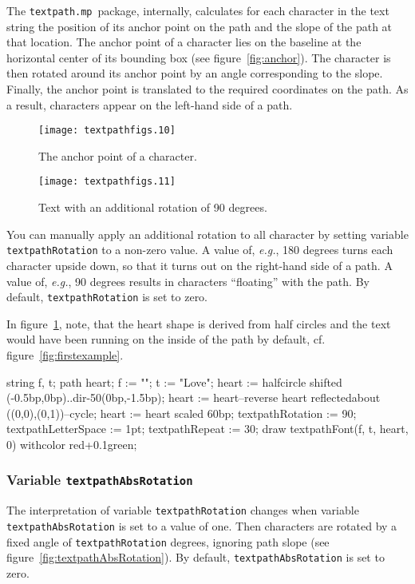 \documentclass{article}
\newcommand*{\cmd}[1]{\texttt{#1}}
\newcommand*{\pkg}{\cmd{textpath.mp}}
\newenvironment{listing}{%
  \small%
  \verbatim%
}{%
  \endverbatim%
}
\begin{document}
The \pkg\ package, internally, calculates for each character in the text string the position of its anchor point on the path and the slope of the path at that location.  The anchor point of a character lies on the baseline at the horizontal center of its bounding box (see figure~\ref{fig:anchor}).  The character is then rotated around its anchor point by an angle corresponding to the slope.  Finally, the anchor point is translated to the required coordinates on the path.  As a result, characters appear on the left-hand side of a path.

\begin{figure}
\begin{minipage}[t]{.45\linewidth}
  \centering
  \texttt{[image: textpathfigs.10]}
  \caption{The anchor point of a character.}
  \label{fig:anchor}
\end{minipage}\hfill
\begin{minipage}[t]{.45\linewidth}
  \centering
  \texttt{[image: textpathfigs.11]}
  \caption{Text with an additional rotation of 90 degrees.}
  \label{fig:textpathRotation}
\end{minipage}
\end{figure}

You can manually apply an additional rotation to all character by setting variable \cmd{textpathRotation} to a non-zero value.  A value of, \emph{e.g.}, 180 degrees turns each character upside down, so that it turns out on the right-hand side of a path.  A value of, \emph{e.g.}, 90 degrees results in characters ``floating'' with the path.  By default, \cmd{textpathRotation} is set to zero.

In figure~\ref{fig:textpathRotation}, note, that the heart shape is derived from half circles and the text would have been running on the inside of the path by default, cf. figure~\ref{fig:firstexample}.

\begin{listing}
string f, t;
path heart;
f := "\tiny";
t := "Love";
heart := halfcircle shifted (-0.5bp,0bp)..{dir-50}(0bp,-1.5bp);
heart := heart--reverse heart reflectedabout ((0,0),(0,1))--cycle;
heart := heart scaled 60bp;
textpathRotation := 90;
textpathLetterSpace := 1pt;
textpathRepeat := 30;
draw textpathFont(f, t, heart, 0) withcolor red+0.1green;
\end{listing}


\subsubsection{Variable \cmd{textpathAbsRotation}}
The interpretation of variable \cmd{textpathRotation} changes when variable \cmd{textpathAbsRotation} is set to a value of one.  Then characters are rotated by a fixed angle of \cmd{textpathRotation} degrees, ignoring path slope (see figure~\ref{fig:textpathAbsRotation}).  By default, \cmd{textpathAbsRotation} is set to zero.
\end{document}
